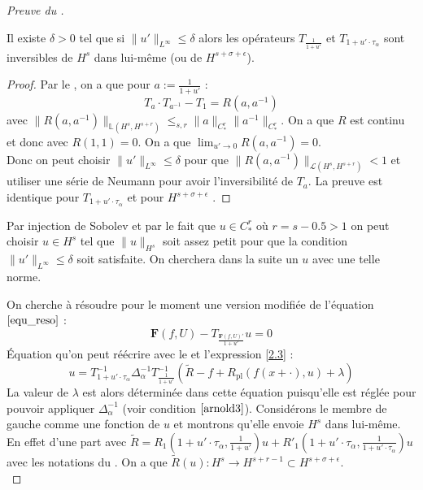 \documentclass[11pt,a4paper]{article}
\begin{document}
\begin{proof}[Preuve du ]
\begin{lemma}\label{inversibilite} 
Il existe $\delta>0$ tel que si $\|u'\|_{L^\infty} \leq \delta $ alors les opérateurs $T_{\frac{1}{1+u'}}$ et $T_{1+u'\cdot \tau_\alpha}$ sont inversibles de $H^s$ dans lui-même (ou de $ H^{s+\sigma+\epsilon}$).
\end{lemma}
\begin{proof}
Par le , on a que pour $a:=\frac{1}{1+u'}$ :
\begin{equation*}
T_a\cdot T_{a^{-1}} -T_1=R(a,a^{-1})
\end{equation*}
avec $\|R(a,a^{-1})\|_{\mathbb{L}(H^s,H^{s+r})} \leq_{s,r} \|a\|_{C^r_*} \|a^{-1}\|_{C^r_*}$. On a que $R$ est continu et donc avec $ R(1,1)=0$. On a que $\lim_{u' \to 0} R(a,a^{-1})=0$. \\
Donc on peut choisir  $\|u'\|_{L^\infty} \leq \delta $  pour que $\|R(a,a^{-1})\|_{\mathcal{L}(H^s,H^{s+r})}<1 $ et utiliser une série de Neumann pour avoir l'inversibilité de $T_a$. La preuve est identique pour $T_{1+u'\cdot \tau_\alpha }$ et pour $ H^{s+\sigma +\epsilon}$ . 
\end{proof}
\begin{rmq}
Par injection de Sobolev et par le fait que $u \in C^r_*$ où $r=s-0.5>1$ on peut choisir  $u \in H^s$ tel que $\|u\|_{H^s}$ soit assez petit pour que la condition $\|u'\|_{L^\infty} \leq \delta $ soit satisfaite. On cherchera dans la suite un $u$ avec une telle norme.
\end{rmq}
On cherche à résoudre pour le moment une version modifiée de l'équation $\eqref{equ_reso}$ :
\begin{equation}\label{equ_reso2}
\mathbf{F}(f,U)-T_{\frac{\mathbf{F}(f,U)'}{1+u'}}u=0
\end{equation}
Équation qu'on peut réécrire avec le  et l'expression \eqref{2.3} :
\begin{equation}\label{equ_reso3}
u=T_{1+u' \cdot \tau_\alpha}^{-1} \Delta_\alpha^{-1} T_{\frac{1}{1+u'}}^{-1}(\tilde{R} -f +R_{\text{pl}}(f(x+\cdot),u) + \lambda)
\end{equation}
La valeur de $\lambda$ est alors déterminée dans cette équation puisqu'elle est réglée pour pouvoir appliquer $\Delta_\alpha^{-1}$ (voir condition $\eqref{arnold3}$).
Considérons le membre de gauche comme une fonction de $u$ et montrons qu'elle envoie $H^s$ dans lui-même.
En effet d'une part avec $\tilde{R}=R_1(1+u'\cdot \tau_\alpha,\frac{1}{1+u'})u +R'_1 ( 1+u' \cdot \tau_\alpha ,\frac{1}{1+u' \cdot \tau_\alpha})u$ avec les notations du . On a que $\tilde{R}(u) : H^s \to H^{s+r-1} \subset H^{s+\sigma +\epsilon}$. \\

\end{proof}
\end{document}
